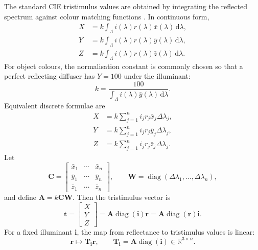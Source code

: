 \documentclass[11pt,a4paper]{article}
\newcommand{\R}{\mathbb{R}}
\newcommand{\diag}{\operatorname{diag}}
\newcommand{\dd}{\,\mathrm{d}}
\newcommand{\vect}[1]{\boldsymbol{#1}}
\newcommand{\mat}[1]{\mathbf{#1}}
\begin{document}
The standard CIE tristimulus values are obtained by integrating the reflected spectrum against colour matching functions \citep{CIE0152018,WyszeckiStiles2000}. In continuous form,
\begin{align}
 X &= k \int_\Lambda i(\lambda)r(\lambda)\bar{x}(\lambda)\dd\lambda, \\
 Y &= k \int_\Lambda i(\lambda)r(\lambda)\bar{y}(\lambda)\dd\lambda, \\
 Z &= k \int_\Lambda i(\lambda)r(\lambda)\bar{z}(\lambda)\dd\lambda.
 \label{eq:xyz_integrals}
\end{align}
For object colours, the normalisation constant is commonly chosen so that a perfect reflecting diffuser has $Y=100$ under the illuminant:
\begin{equation}
 k=\frac{100}{\int_\Lambda i(\lambda)\bar{y}(\lambda)\dd\lambda}.
 \label{eq:k_norm}
\end{equation}
Equivalent discrete formulae are
\begin{align}
 X &= k \sum_{j=1}^{n} i_j r_j \bar{x}_j \Delta\lambda_j,\\
 Y &= k \sum_{j=1}^{n} i_j r_j \bar{y}_j \Delta\lambda_j,\\
 Z &= k \sum_{j=1}^{n} i_j r_j \bar{z}_j \Delta\lambda_j.
\end{align}
Let
\begin{equation}
 \mat{C}=\begin{bmatrix}
 \bar{x}_1 & \cdots & \bar{x}_n\\
 \bar{y}_1 & \cdots & \bar{y}_n\\
 \bar{z}_1 & \cdots & \bar{z}_n
 \end{bmatrix},\qquad
 \mat{W}=\diag(\Delta\lambda_1,\ldots,\Delta\lambda_n),
\end{equation}
and define $\mat{A}=k\mat{C}\mat{W}$. Then the tristimulus vector is
\begin{equation}
 \vect{t}=\begin{bmatrix}X\\Y\\Z\end{bmatrix}
          =\mat{A}\diag(\vect{i})\vect{r}
          =\mat{A}\diag(\vect{r})\vect{i}.
 \label{eq:operator_basic}
\end{equation}
For a fixed illuminant $\vect{i}$, the map from reflectance to tristimulus values is linear:
\begin{equation}
 \vect{r}\mapsto \mat{T}_{\vect{i}}\vect{r},\qquad
 \mat{T}_{\vect{i}}=\mat{A}\diag(\vect{i})\in\R^{3\times n}.
 \label{eq:T_i}
\end{equation}
\end{document}
